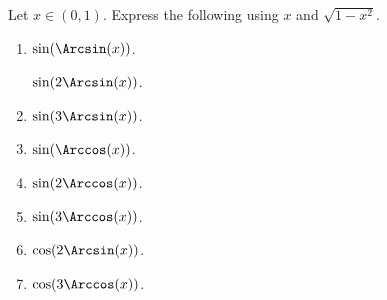 Let $x\in (0,1)$. Express the following using $x$ and $\sqrt{1-x^2}$.  
\begin{multicols}{2}
\begin{enumerate} [ref={\fcProblemRef}]
\item $\sin(\Arcsin (x))$. 

 \label{problemsin(2arcsin x)}  $\sin(2\Arcsin (x))$. 

\item  \label{problemsin(3arcsin x)} $\sin(3\Arcsin (x))$. 

\item $\sin(\Arccos (x))$. 

\item $\sin(2\Arccos (x))$. 

\item \label{problemsin(3arccos(x))}  $\sin(3\Arccos (x))$. 

\item $\cos(2\Arcsin (x))$. 

\item $\cos(3\Arccos (x))$. 

\end{enumerate}
\end{multicols}